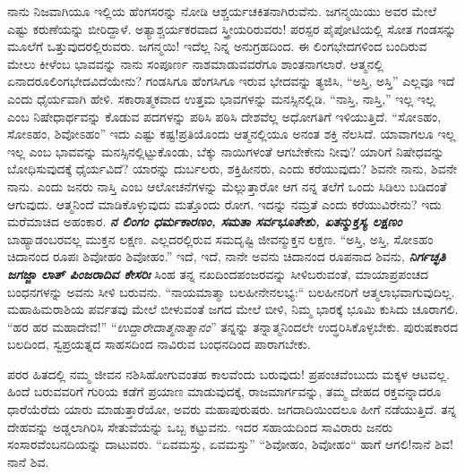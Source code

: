 ನಾನು ನಿಜವಾಗಿಯೂ ಇಲ್ಲಿಯ ಹೆಂಗಸರನ್ನು ನೋಡಿ ಆಶ್ಚರ್ಯಚಕಿತನಾಗಿರುವೆನು. ಜಗನ್ಮಯಿಯು ಅವರ ಮೇಲೆ ಎಷ್ಟು ಕರುಣೆಯನ್ನು ಬೀರಿದ್ದಾಳೆ. ಅತ್ಯಾಶ್ಚರ್ಯಕರವಾದ ಸ್ತ್ರೀಯರಿರುವರು! ಪರಸ್ಪರ ಪೈಪೋಟಿಯಲ್ಲಿ ಸೋತ ಗಂಡಸನ್ನು ಮೂಲೆಗೆ ಒತ್ತುವುದರಲ್ಲಿರುವರು. ಜಗನ್ಮಯಿ! ಇದೆಲ್ಲ ನಿನ್ನ ಅನುಗ್ರಹದಿಂದ. ಈ ಲಿಂಗಭೇದಗಳಿಂದ ಬಂದಿರುವ ಮೇಲು ಕೀಳೆಂಬ ಭಾವವನ್ನು ನಾನು ಸಂಪೂರ್ಣ ನಾಶಮಾಡುವವರೆಗೂ ಶಾಂತನಾಗಲಾರೆ. ಆತ್ಮನಲ್ಲಿ ಏನಾದರೂಲಿಂಗಭೇದವಿದೆಯೇನು? ಗಂಡಸಿಗೂ ಹೆಂಗಸಿಗೂ ಇರುವ ಭೇದವನ್ನು ತ್ಯಜಿಸಿ, “ಅಸ್ತಿ, ಅಸ್ತಿ” ಎಲ್ಲವೂ ಇದೆ ಎಂದು ಧೈರ್ಯವಾಗಿ ಹೇಳಿ. ಸಕಾರಾತ್ಮಕವಾದ ಉತ್ತಮ ಭಾವಗಳನ್ನು ಮನಸ್ಸಿನಲ್ಲಿಡಿ. “ನಾಸ್ತಿ, ನಾಸ್ತಿ,” ಇಲ್ಲ ಇಲ್ಲ ಎಂಬ ನಿಷೇಧಾರ್ಥವನ್ನು ಕೊಡುವ ಪದಗಳನ್ನು ಪಠಿಸಿ ಪಠಿಸಿ ದೇಶವೆಲ್ಲ ಅಧೋಗತಿಗೆ ಇಳಿಯುತ್ತಿದೆ. “ಸೋಽಹಂ, ಸೋಽಹಂ, ಶಿವೋಽಹಂ” ಇದು ಎಷ್ಟು ಕಷ್ಟ!ಪ್ರತಿಯೊಂದು ಆತ್ಮನಲ್ಲಿಯೂ ಅನಂತ ಶಕ್ತಿ ನೆಲಸಿದೆ. ಯಾವಾಗಲೂ ಇಲ್ಲ ಇಲ್ಲ ಎಂಬ ಭಾವವನ್ನು ಮನಸ್ಸಿನಲ್ಲಿಟ್ಟುಕೊಂಡು, ಬೆಕ್ಕು ನಾಯಿಗಳಂತೆ ಆಗಬೇಕೇನು ನೀವು? ಯಾರಿಗೆ ನಿಷೇಧವನ್ನು ಬೋಧಿಸುವುದಕ್ಕೆ ಧೈರ್ಯವಿದೆ? ಯಾರನ್ನು ದುರ್ಬಲರು, ಶಕ್ತಿಹೀನರು, ಎಂದು ಕರೆಯುವುದು? ಶಿವನೇ ನಾನು, ಶಿವನೇ ನಾನು. ಎಂದು ಜನರು ನಾಸ್ತಿ ಎಂಬ ಆಲೋಚನೆಗಳನ್ನು ಮೆಲ್ಲುತ್ತಾರೋ ಆಗ ನನ್ನ ತಲೆಗೆ ಒಂದು ಸಿಡಿಲು ಬಡಿದಂತೆ ಆಗುವುದು. ಆತ್ಮನಿಂದೆ ಮಾಡಿಕೊಳ್ಳುವುದು ಮತ್ತೊಂದು ರೋಗ. ಇದನ್ನು ನಮ್ರತೆ ಎಂದು ಕರೆಯುವಿರೇನು? ಇದು ಮರೆಮಾಚಿದ ಅಹಂಕಾರ. \textbf{\textit{ನ ಲಿಂಗಂ ಧರ್ಮಕಾರಣಂ, ಸಮತಾ ಸರ್ವಭೂತೇಶು, ಏತನ್ಮುಕ್ತಸ್ಯ ಲಕ್ಷಣಂ}} ಬಾಹ್ಯಾಡಂಬರವಲ್ಲ ಮುಕ್ತನ ಲಕ್ಷಣ. ಎಲ್ಲದರಲ್ಲಿರುವ ಸಮದೃಷ್ಟಿ ಜೀವನ್ಮುಕ್ತನ ಲಕ್ಷಣ. “ಅಸ್ತಿ, ಅಸ್ತಿ, ಸೋಽಹಂ ಚಿದಾನಂದ ರೂಪಃ ಶಿವೋಹಂ ಶಿವೋಹಂ.” ಇದೆ, ಇದೆ, ನಾನೇ ಅವನು ಚಿದಾನಂದ ರೂಪನಾದ ಶಿವನು, \textbf{\textit{ನಿರ್ಗಚ್ಛತಿ ಜಗಜ್ಜಾ ಲಾತ್ ಪಿಂಜರಾದಿವ ಕೇಸರಿಃ}} \enginline{-} ಸಿಂಹ ತನ್ನ ನಖದಿಂದಪಂಜರವನ್ನು ಸೀಳಿಬರುವಂತೆ, ಮಾಯಾಪ್ರಪಂಚದ ಬಂಧನಗಳನ್ನು ಅವನು ಸೀಳಿ ಬರುವನು. “ನಾಯಮಾತ್ಮಾ ಬಲಹೀನೇನಲಭ್ಯ:“ ಬಲಹೀನರಿಗೆ ಆತ್ಮಲಾಭವಾಗುವುದಿಲ್ಲ. ಮಹಾಹಿಮರಾಶಿಯ ಪರ್ವತವು ಮೇಲೆ ಬೀಳುವಂತೆ ಜಗದ ಮೇಲೆ ಬೀಳಿ, ನಿಮ್ಮ ಭಾರಕ್ಕೆ ಭೂಮಿ ಕುಸಿದು ಚೂರಾಗಲಿ. “ಹರ ಹರ ಮಹಾದೇವ!” “\textit{ಉದ್ದಾರೇದಾತ್ಮನಾತ್ಮಾನಂ}” ತನ್ನನ್ನು ತನ್ನಾತ್ಮನಿಂದಲೇ ಉದ್ಧರಿಸಿಕೊಳ್ಳಬೇಕು. ಪುರುಷಕಾರದ ಬಲದಿಂದ, ಸ್ವಪ್ರಯತ್ನದ ಸಾಹಸದಿಂದ ನಾವಿರುವ ಬಂಧನದಿಂದ ಪಾರಾಗಬೇಕು.

ಪರರ ಹಿತದಲ್ಲಿ ನಮ್ಮ ಜೀವನ ನಶಿಸಿಹೋಗುವಂತಹ ಕಾಲವೆಂದು ಬರುವುದು! ಪ್ರಪಂಚವೆಂಬುದು ಮಕ್ಕಳ ಆಟವಲ್ಲ. ಹಿಂದೆ ಬರುವವರಿಗೆ ಗುರಿಯ ಕಡೆಗೆ ಪ್ರಯಾಣ ಮಾಡುವುದಕ್ಕೆ, ರಾಜಮಾರ್ಗವನ್ನು, ತಮ್ಮ ದೇಹದ ರಕ್ತವನ್ನಾದರೂ ಧಾರೆಯೆರೆದು ಯಾರು ಮಾಡುತ್ತಾರೆಯೋ, ಅವರು ಮಹಾಪುರುಷರು. ಜಗದಾದಿಯಿಂದಲೂ ಹೀಗೆ ನಡೆಯುತ್ತಿದೆ. ತನ್ನ ದೇಹವನ್ನು ಅಡ್ಡಲಾಗಿರಿಸಿ ಸೇತುವೆಯನ್ನು ಒಬ್ಬ ಕಟ್ಟುವನು. ಇದರ ಸಹಾಯದಿಂದ ಸಾವಿರಾರು ಜನರು ಸಂಸಾರವೆಂಬನದಿಯನ್ನು ದಾಟುವರು. “ಏವಮಸ್ತು, ಏವಮಸ್ತು” “ಶಿವೋಹಂ, ಶಿವೋಹಂ“ ಹಾಗೆ ಆಗಲಿ!ನಾನೆ ಶಿವ! ನಾನೆ ಶಿವ.

